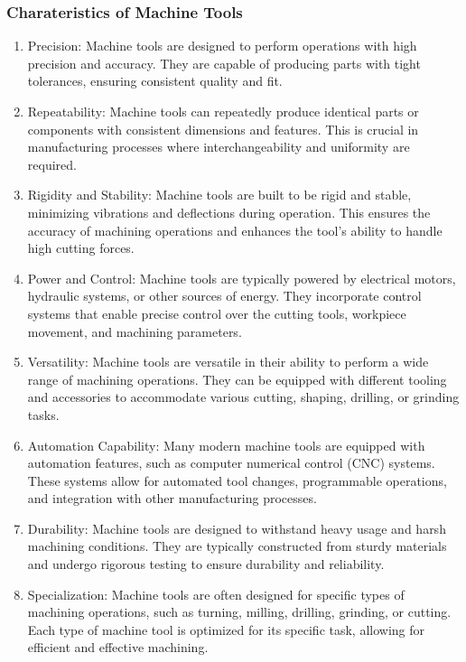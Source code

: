 \documentclass{article}
\begin{document}
\subsubsection*{Charateristics of Machine Tools}
\begin{enumerate}[label=\roman*.]
  \item Precision: Machine tools are designed to perform operations with high precision and accuracy. They are capable of producing parts with tight tolerances, ensuring consistent quality and fit.

\item Repeatability: Machine tools can repeatedly produce identical parts or components with consistent dimensions and features. This is crucial in manufacturing processes where interchangeability and uniformity are required.

\item Rigidity and Stability: Machine tools are built to be rigid and stable, minimizing vibrations and deflections during operation. This ensures the accuracy of machining operations and enhances the tool's ability to handle high cutting forces.

\item Power and Control: Machine tools are typically powered by electrical motors, hydraulic systems, or other sources of energy. They incorporate control systems that enable precise control over the cutting tools, workpiece movement, and machining parameters.

\item Versatility: Machine tools are versatile in their ability to perform a wide range of machining operations. They can be equipped with different tooling and accessories to accommodate various cutting, shaping, drilling, or grinding tasks.

\item Automation Capability: Many modern machine tools are equipped with automation features, such as computer numerical control (CNC) systems. These systems allow for automated tool changes, programmable operations, and integration with other manufacturing processes.

\item Durability: Machine tools are designed to withstand heavy usage and harsh machining conditions. They are typically constructed from sturdy materials and undergo rigorous testing to ensure durability and reliability.

\item Specialization: Machine tools are often designed for specific types of machining operations, such as turning, milling, drilling, grinding, or cutting. Each type of machine tool is optimized for its specific task, allowing for efficient and effective machining.
\end{enumerate}
\end{document}
